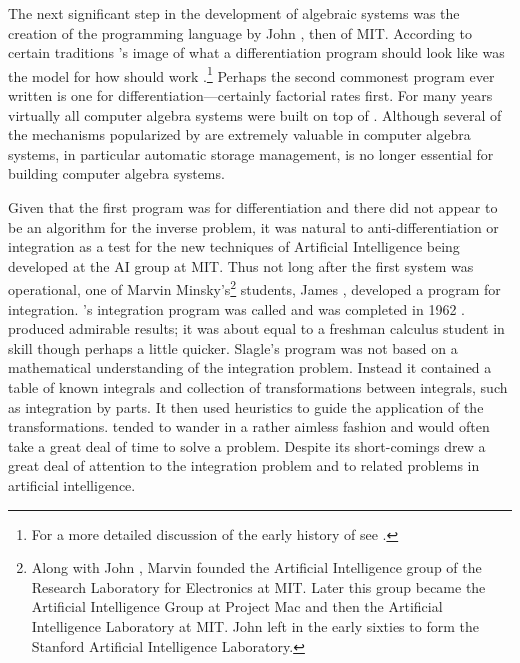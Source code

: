 The next significant step in the development of algebraic systems was
the creation of the programming language {\Lisp} by John {\McCarthy}
\cite{LISP:one,LISP:one:half}, then of MIT.  According to certain
traditions {\McCarthy}'s image of what a differentiation program should
look like was the model for how {\Lisp} should work
\cite{McCarthy:Recursive:Functions}.\footnote{For a more detailed
discussion of the early history of {\Lisp} see \cite{Stoyan:Lisp:History}.}
Perhaps the second commonest {\Lisp} program ever written is one for
differentiation---certainly factorial rates first.  For many years
virtually all computer algebra systems were built on top of {\Lisp}.  Although
several of the mechanisms popularized by {\Lisp} are extremely valuable in
computer algebra systems, in particular automatic storage management, {\Lisp}
is no longer essential for building computer algebra systems.

Given that the first {\Lisp} program was for differentiation and there
did not appear to be an algorithm for the inverse problem, it was
natural to anti-differentiation or integration as a test for the new
techniques of Artificial Intelligence being developed at the AI group
at MIT. Thus not long
after the first {\Lisp} system was operational, one of Marvin
Minsky's\footnote{Along with John {\McCarthy}, Marvin {\Minsky} founded the
Artificial Intelligence group of the Research Laboratory for
Electronics at MIT.  Later this group became the Artificial
Intelligence Group at Project Mac and then the Artificial Intelligence
Laboratory at MIT.  John {\McCarthy} left in the early sixties to form
the Stanford Artificial Intelligence Laboratory.} students, James {\Slagle},
developed a program for integration.  {\Slagle}'s integration program
was called {\Saint} and was completed in 1962 \cite{Slagle:Thesis}.
{\Saint} produced admirable results; it was about equal to a freshman
calculus student in skill though perhaps a little quicker.  Slagle's
program was not based on a mathematical understanding of the
integration problem.  Instead it contained a table of known integrals
and collection of transformations between integrals, such as
integration by parts.  It then used heuristics to guide the
application of the transformations.  {\Saint} tended to wander in a
rather aimless fashion and would often take a great deal of time to
solve a problem.  Despite its short-comings {\Saint} drew a great
deal of attention to the integration problem and to related problems
in artificial intelligence.

